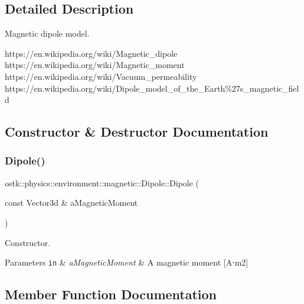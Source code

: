 \subsection{Detailed Description}
Magnetic dipole model. 

https\+://en.wikipedia.\+org/wiki/\+Magnetic\+\_\+dipole https\+://en.wikipedia.\+org/wiki/\+Magnetic\+\_\+moment https\+://en.wikipedia.\+org/wiki/\+Vacuum\+\_\+permeability https\+://en.wikipedia.\+org/wiki/\+Dipole\+\_\+model\+\_\+of\+\_\+the\+\_\+\+Earth\%27s\+\_\+magnetic\+\_\+field 

\subsection{Constructor \& Destructor Documentation}
\mbox{\label{classostk_1_1physics_1_1environment_1_1magnetic_1_1_dipole_a974e9a8c1062516d6c872b96d5573779}} 
\subsubsection{\texorpdfstring{Dipole()}{Dipole()}}
{\footnotesize\ttfamily ostk\+::physics\+::environment\+::magnetic\+::\+Dipole\+::\+Dipole (\begin{DoxyParamCaption}\item[{const Vector3d \&}]{a\+Magnetic\+Moment }\end{DoxyParamCaption})}



Constructor. 


\begin{DoxyParams}[1]{Parameters}
\mbox{\tt in}  & {\em a\+Magnetic\+Moment} & A magnetic moment \mbox{[}A⋅m2\mbox{]} \\
\hline
\end{DoxyParams}


\subsection{Member Function Documentation}
\mbox{\label{classostk_1_1physics_1_1environment_1_1magnetic_1_1_dipole_ad4255ff1007a339c9f0bdbda321c0ab2}} 
